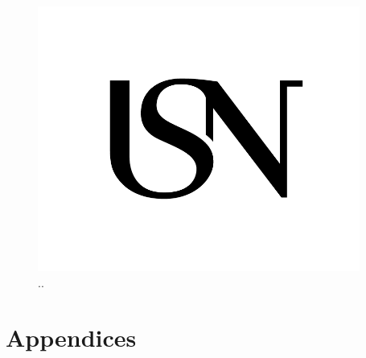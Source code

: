 \documentclass{article}
\begin{document}
\begin{figure}[H]
 \centering
  \includegraphics[width=300pt]{img/usn.png}
 \caption{..}
 \end{figure}




\section{Appendices}


\newpage

\nocite{*}



\end{document}
